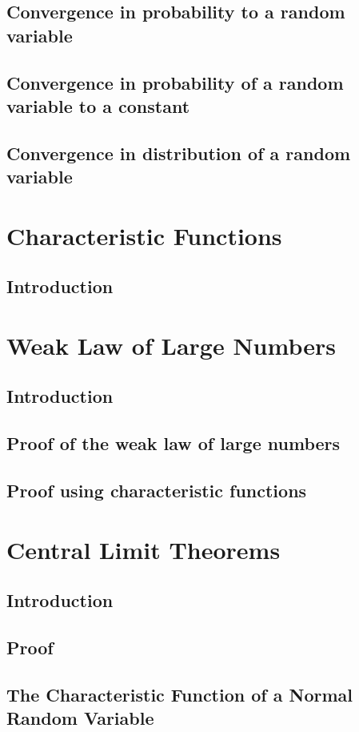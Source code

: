 \documentclass[10pt,a4paper]{book}
\begin{document}
	\section{Convergence in probability to a random variable}
	\section{Convergence in probability of a random variable to a constant}
	\section{Convergence in distribution of a random variable}
	
	\chapter{Characteristic Functions}
	\section{Introduction}

	\chapter{Weak Law of Large Numbers}
	\section{Introduction}
	\section{Proof of the weak law of large numbers}
	\section{Proof using characteristic functions}
	
	\chapter{Central Limit Theorems}
	\section{Introduction}
	\section{Proof}
	\section{The Characteristic Function of a Normal Random Variable}
\end{document}
